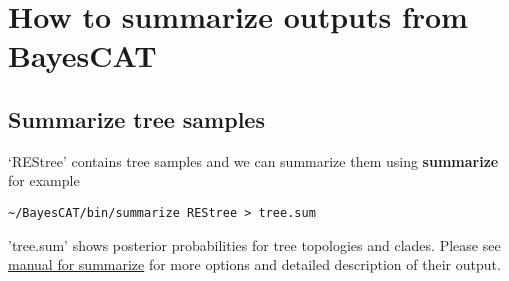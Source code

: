 \documentclass[11pt]{article}
\begin{document}
\section{How to summarize outputs from BayesCAT}
\label{sec-5}
\subsection{Summarize tree samples}
\label{sec-5-1}
`REStree' contains tree samples and we can summarize them using \textbf{summarize} for example
\begin{lstlisting}
~/BayesCAT/bin/summarize REStree > tree.sum
\end{lstlisting}
'tree.sum' shows posterior probabilities for tree topologies and clades. Please see \href{http://badger.duq.edu/manual2/summarize.html}{manual for summarize} for more options and detailed description of their output. 
\end{document}
